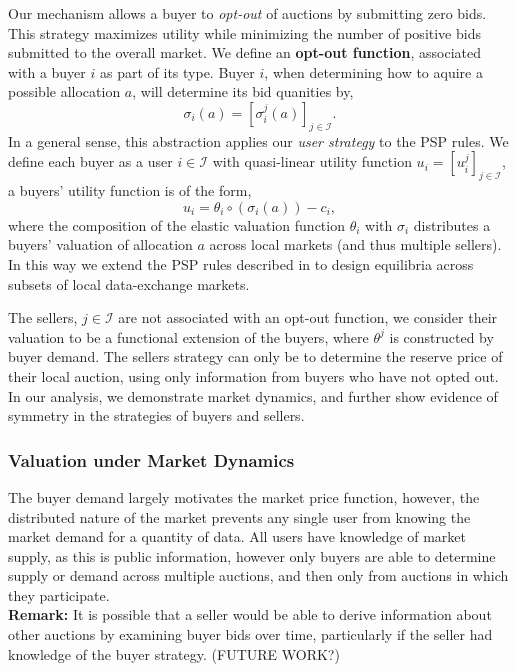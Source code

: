 \documentclass[sigconf, anonymous]{acmart}
\newcommand{\mcI}{\mathcal{I}}
\newcommand{\g}{\sigma}
\theoremstyle{definition}
\begin{document}
Our mechanism allows a buyer
to \emph{opt-out} of auctions by submitting zero bids. This strategy maximizes
utility while minimizing the number of positive bids submitted to the overall
market. We define an \textbf{opt-out function}, associated with a buyer $i$ as
part of its type. Buyer $i$, when determining how to aquire a possible allocation $a$,
will determine its bid quanities by,
\begin{equation}\label{opt-out}
    \g_i(a) = [\g_i^j(a)]_{j\in\mcI}.
\end{equation}
In a general sense, this abstraction applies our \emph{user strategy}
to the PSP rules.
We define each buyer as a user $i\in\mcI$ with quasi-linear utility
function $u_i = [u_i^j]_{j\in\mcI}$, a buyers' utility function is of the form,
\begin{equation}\label{buyerutility}
    u_i = \theta_i \circ (\g_i(a)) - c_i,
\end{equation}
where the composition of the elastic valuation function $\theta_i$ with $\g_i$
distributes a buyers' valuation of allocation $a$ across local markets (and thus
multiple sellers).
In this way we extend the PSP rules described
in \cite{semret} to design equilibria across subsets of local data-exchange markets.

The sellers, $j\in\mcI$ are not associated with an opt-out function, we
consider their valuation to be a functional extension of the buyers, where
$\theta^j$ is constructed by buyer demand.
The sellers strategy can only be to determine the reserve price of their local
auction, using only information from buyers who have not opted out.
In our analysis, we demonstrate market dynamics, and further show evidence of symmetry in the strategies of
buyers and sellers.

\subsubsection{Valuation under Market Dynamics}
The buyer demand largely motivates the market price function, however, the
distributed nature of the market prevents any single user from knowing the
market demand for a quantity of data. All users have knowledge of market
supply, as this is public information, however only buyers
are able to determine supply or demand across multiple auctions, and then only from auctions
in which they participate. \\
\textbf{Remark:}
It is possible that a seller would be able to derive information about other
auctions by examining buyer bids over time, particularly if the seller had knowledge of the
buyer strategy. (FUTURE WORK?)\\
\end{document}
